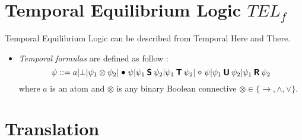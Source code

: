 \section{Temporal Equilibrium Logic $TEL_f$}\label{sec:telf}

Temporal Equilibrium Logic can be described from Temporal Here and There.

\begin{itemize}
  \item \emph{Temporal formulas} are defined as follow :
  $$\psi ::= a | \bot | \psi_1\otimes\psi_2 | \previous\psi | \psi_1\since\psi_2 | \psi_1\trigger\psi_2 | \next\psi | \psi_1\until\psi_2 | \psi_1\release\psi_2 $$
  where $a$ is an atom and $\otimes$ is any binary Boolean connective $\otimes \in \{\rightarrow, \wedge, \vee\}$.
\end{itemize}

\section{Translation}\label{sec:trans}
